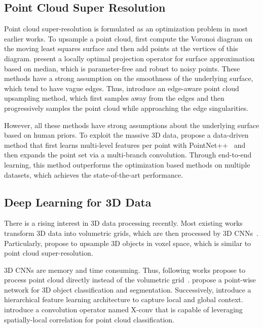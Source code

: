 \documentclass[10pt,twocolumn,letterpaper]{article}
\begin{document}
\subsection{Point Cloud Super Resolution}
Point cloud super-resolution is formulated as an optimization problem in most earlier works.
To upsample a point cloud, \cite{alexa2003computing} first compute the Voronoi diagram on the moving least squares surface and then add points at the vertices of this diagram.
\cite{lipman2007parameterization} present a locally optimal projection operator for surface approximation based on  median, which is parameter-free and robust to noisy points.
These methods have a strong assumption on the smoothness of the underlying surface, which tend to have vague edges.
Thus, \cite{huang2013edge} introduce an edge-aware point cloud upsampling method, which first samples away from the edges and then progressively samples the point cloud while approaching the edge singularities.

However, all these methods have strong assumptions about the underlying surface based on human priors.
To exploit the massive 3D data, \cite{yu2018pu} propose a data-driven method that first learns multi-level features per point with PointNet++~\cite{qi2017pointnet++} and then expands the point set via a multi-branch convolution.
Through end-to-end learning, this method outperforms the optimization based methods on multiple datasets, which achieves the state-of-the-art performance.

\subsection{Deep Learning for 3D Data}
There is a rising interest in 3D data processing recently.
Most existing works transform 3D data into volumetric grids, which are then processed by 3D CNNs~\cite{smith20183d,maturana2015voxnet,wu20153d,riegler2017octnet}.
Particularly, \cite{smith20183d} propose to upsample 3D objects in voxel space, which is similar to point cloud super-resolution.

3D CNNs are memory and time consuming.
Thus, following works propose to process point cloud directly instead of the volumetric grid~\cite{qi2016pointnet,qi2017pointnet++,li2018pointcnn,su2018splatnet,li2018so,jiang2018pointsift}.
\cite{qi2016pointnet} propose a point-wise network for 3D object classification and segmentation.
Successively, \cite{qi2017pointnet++} introduce a hierarchical feature learning architecture to capture local and global context.
\cite{li2018pointcnn} introduce a convolution operator named X-conv that is capable of leveraging spatially-local correlation for point cloud  classification.
\end{document}
